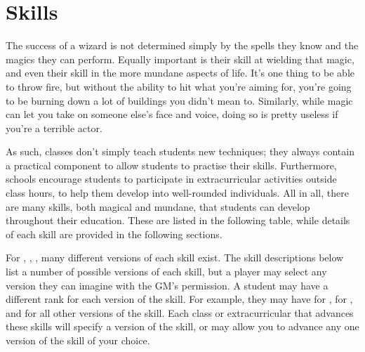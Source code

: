 \chapter{Skills}

The success of a wizard is not determined simply by the spells they know and the magics they can perform.
Equally important is their skill at wielding that magic, and even their skill in the more mundane aspects of life.
It's one thing to be able to throw fire, but without the ability to hit what you're aiming for, you're going to be burning down a lot of buildings you didn't mean to.
Similarly, while magic can let you take on someone else's face and voice, doing so is pretty useless if you're a terrible actor.

As such, classes don't simply teach students new techniques; they always contain a practical component to allow students to practise their skills.
Furthermore, schools encourage students to participate in extracurricular activities outside class hours, to help them develop into well-rounded individuals.
All in all, there are many skills, both magical and mundane, that students can develop throughout their education.
These are listed in the following table, while details of each skill are provided in the following sections.


For , , , many different versions of each skill exist.
The skill descriptions below list a number of possible versions of each skill, but a player may select any version they can imagine with the GM's permission.
A student may have a different rank for each version of the skill.
For example, they may have  for ,  for , and  for all other versions of the skill.
Each class or extracurricular that advances these skills will specify a version of the skill, or may allow you to advance any one version of the skill of your choice.

